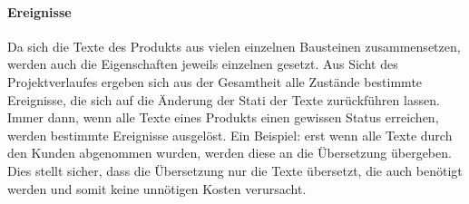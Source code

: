 \paragraph{Ereignisse} Da sich die Texte des Produkts aus vielen einzelnen Bausteinen zusammensetzen, werden auch die Eigenschaften jeweils einzelnen gesetzt. Aus Sicht des Projektverlaufes ergeben sich aus der Gesamtheit alle Zustände bestimmte Ereignisse, die sich auf die Änderung der Stati der Texte zurückführen lassen. Immer dann, wenn alle Texte eines Produkts einen gewissen Status erreichen, werden bestimmte Ereignisse ausgelöst. Ein Beispiel: erst wenn alle Texte durch den Kunden abgenommen wurden, werden diese an die Übersetzung übergeben. Dies stellt sicher, dass die Übersetzung nur die Texte übersetzt, die auch benötigt werden und somit keine unnötigen Kosten verursacht.
